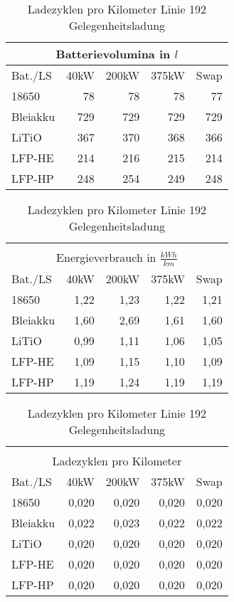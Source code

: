 \begin{table}
\begin{minipage}{0.45\textwidth}
	\end{minipage}\hfill
	\begin{minipage}{0.45\textwidth}
		\centering
		\begin{tabular}{lrrrr}
			\multicolumn{5}{c}{Batterievolumina in $l$} \\ \toprule
			Bat./LS  & 40kW & 200kW & 375kW &      Swap \\ \midrule
			18650    &   78 &    78 &    78 &        77 \\
			Bleiakku &  729 &   729 &   729 &       729 \\
			LiTiO    &  367 &   370 &   368 &       366 \\
			LFP-HE   &  214 &   216 &   215 &       214 \\
			LFP-HP   &  248 &   254 &   249 &       248 \\ \bottomrule
		\end{tabular}
		\caption{Batterievolumina Linie 192 Gelegenheitsladung}
		
		\begin{tabular}{lrrrr}
			         &      &       &       &  \\
			\multicolumn{5}{c}{Energieverbrauch in $\frac{kWh}{km}$} \\ \toprule
			Bat./LS  & 40kW & 200kW & 375kW &                   Swap \\ \midrule
			18650    & 1,22 &  1,23 &  1,22 &                   1,21 \\
			Bleiakku & 1,60 &  2,69 &  1,61 &                   1,60 \\
			LiTiO    & 0,99 &  1,11 &  1,06 &                   1,05 \\
			LFP-HE   & 1,09 &  1,15 &  1,10 &                   1,09 \\
			LFP-HP   & 1,19 &  1,24 &  1,19 &                   1,19 \\ \bottomrule
		\end{tabular} 
		\caption{Energieverbrauch Linie 192 Gelegenheitsladung}
		
		\begin{tabular}{lrrrr}
			         &       &       &       &  \\
			\multicolumn{5}{c}{Ladezyklen pro Kilometer} \\ \toprule
			Bat./LS  &  40kW & 200kW & 375kW &      Swap \\ \midrule
			18650    & 0,020 & 0,020 & 0,020 &     0,020 \\
			Bleiakku & 0,022 & 0,023 & 0,022 &     0,022 \\
			LiTiO    & 0,020 & 0,020 & 0,020 &     0,020 \\
			LFP-HE   & 0,020 & 0,020 & 0,020 &     0,020 \\
			LFP-HP   & 0,020 & 0,020 & 0,020 &     0,020 \\ \bottomrule
		\end{tabular} 
		\caption{Ladezyklen pro Kilometer Linie 192 Gelegenheitsladung}
		\label{192_e}
	\end{minipage}	
\end{table}